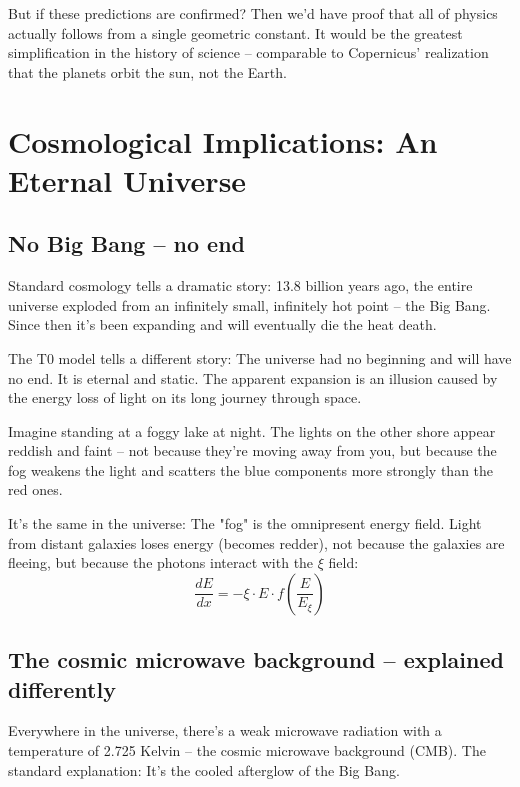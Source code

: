 \documentclass[12pt,a4paper]{article}
\newcommand{\xipar}{\ensuremath{\xi}}
\begin{document}
	But if these predictions are confirmed? Then we'd have proof that all of physics actually follows from a single geometric constant. It would be the greatest simplification in the history of science -- comparable to Copernicus' realization that the planets orbit the sun, not the Earth.
	
	\section{Cosmological Implications: An Eternal Universe}
	
	\subsection{No Big Bang -- no end}
	
	Standard cosmology tells a dramatic story: 13.8 billion years ago, the entire universe exploded from an infinitely small, infinitely hot point -- the Big Bang. Since then it's been expanding and will eventually die the heat death.
	
	The T0 model tells a different story: The universe had no beginning and will have no end. It is eternal and static. The apparent expansion is an illusion caused by the energy loss of light on its long journey through space.
	
	\begin{revolutionary}
		Imagine standing at a foggy lake at night. The lights on the other shore appear reddish and faint -- not because they're moving away from you, but because the fog weakens the light and scatters the blue components more strongly than the red ones. 
		
		It's the same in the universe: The "fog" is the omnipresent energy field. Light from distant galaxies loses energy (becomes redder), not because the galaxies are fleeing, but because the photons interact with the $\xipar$ field:
		\begin{equation}
			\frac{dE}{dx} = -\xipar \cdot E \cdot f\left(\frac{E}{E_\xi}\right)
		\end{equation}
	\end{revolutionary}
	
	\subsection{The cosmic microwave background -- explained differently}
	
	Everywhere in the universe, there's a weak microwave radiation with a temperature of 2.725 Kelvin -- the cosmic microwave background (CMB). The standard explanation: It's the cooled afterglow of the Big Bang.
	
\end{document}
